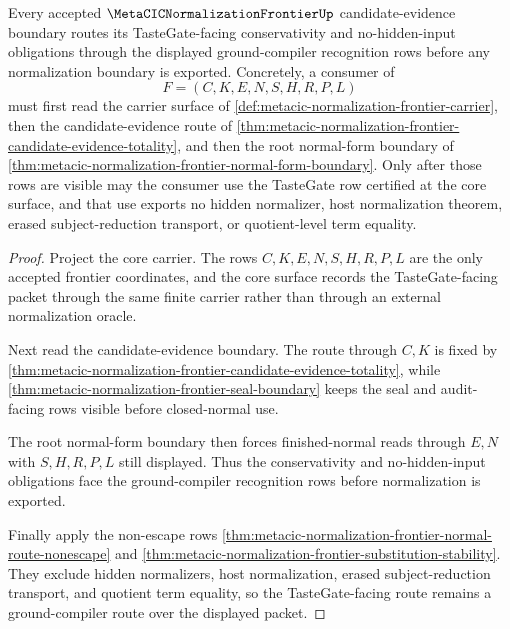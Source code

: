 \begin{theorem}
\label{thm:metacic-normalization-frontier-ground-compiler-route}
Every accepted $\MetaCICNormalizationFrontierUp$ candidate-evidence boundary routes its TasteGate-facing conservativity and no-hidden-input obligations through the displayed ground-compiler recognition rows before any normalization boundary is exported. Concretely, a consumer of
$$
F=(C,K,E,N,S,H,R,P,L)
$$
must first read the carrier surface of \autoref{def:metacic-normalization-frontier-carrier}, then the candidate-evidence route of \autoref{thm:metacic-normalization-frontier-candidate-evidence-totality}, and then the root normal-form boundary of \autoref{thm:metacic-normalization-frontier-normal-form-boundary}. Only after those rows are visible may the consumer use the TasteGate row certified at the core surface, and that use exports no hidden normalizer, host normalization theorem, erased subject-reduction transport, or quotient-level term equality.
\end{theorem}
\begin{proof}
Project the core carrier. The rows $C,K,E,N,S,H,R,P,L$ are the only accepted frontier coordinates, and the core surface records the TasteGate-facing packet through the same finite carrier rather than through an external normalization oracle.

Next read the candidate-evidence boundary. The route through $C,K$ is fixed by \autoref{thm:metacic-normalization-frontier-candidate-evidence-totality}, while \autoref{thm:metacic-normalization-frontier-seal-boundary} keeps the seal and audit-facing rows visible before closed-normal use.

The root normal-form boundary then forces finished-normal reads through $E,N$ with $S,H,R,P,L$ still displayed. Thus the conservativity and no-hidden-input obligations face the ground-compiler recognition rows before normalization is exported.

Finally apply the non-escape rows \autoref{thm:metacic-normalization-frontier-normal-route-nonescape} and \autoref{thm:metacic-normalization-frontier-substitution-stability}. They exclude hidden normalizers, host normalization, erased subject-reduction transport, and quotient term equality, so the TasteGate-facing route remains a ground-compiler route over the displayed packet.
\end{proof}

